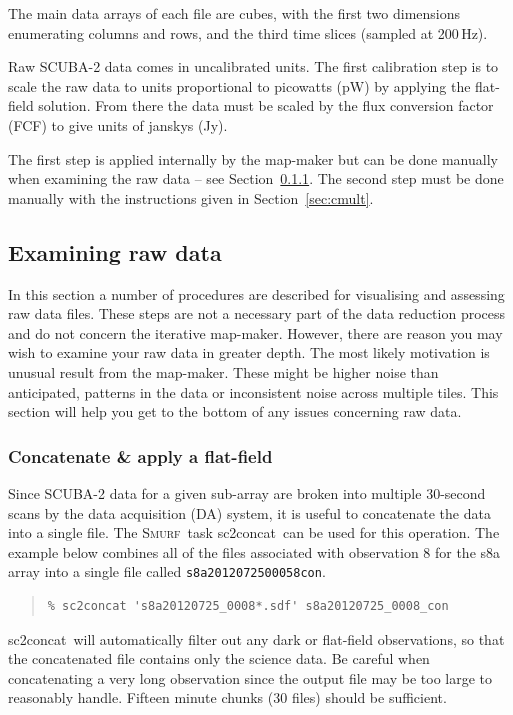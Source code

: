 \documentclass[twoside,11pt]{article}
\newcommand{\xref}[3]{#1}
\newcommand{\xlabel}[1]{}
\renewcommand{\_}{\texttt{\symbol{95}}}
\newenvironment{myquote}{\begin{quote}\begin{small}}{\end{small}\end{quote}}
\newcommand{\smurf}{\xref{\textsc{Smurf}}{sun258}{}}
\newcommand{\task}[1]{\textsf{#1}}
\newcommand{\concat}{\xref{\task{sc2concat}}{sun258}{SC2CONCAT}}
\begin{document}
The main data arrays of each file are cubes, with the first two
dimensions enumerating columns and rows, and the third time slices
(sampled at 200\,Hz).

Raw SCUBA-2 data comes in uncalibrated units. The first calibration
step is to scale the raw data to units proportional to picowatts (pW)
by applying the flat-field solution. From there the data must be
scaled by the flux conversion factor (FCF) to give units of janskys
(Jy).

The first step is applied internally by the map-maker but can be done
manually when examining the raw data -- see Section~\ref{sec:concat}.
The second step must be done manually with the instructions given in
Section~\ref{sec:cmult}.


\subsection{\xlabel{examine}Examining raw data}
\label{sec:exam}

In this section a number of procedures are described for visualising
and assessing raw data files.  These steps are not a necessary part of
the data reduction process and do not concern the iterative map-maker.
However, there are reason you may wish to examine your raw data in
greater depth. The most likely motivation is unusual result from the
map-maker. These might be higher noise than anticipated, patterns in
the data or inconsistent noise across multiple tiles. This section
will help you get to the bottom of any issues concerning raw data.

\subsubsection{\xlabel{concat}Concatenate \& apply a flat-field}
\label{sec:concat}

Since SCUBA-2 data for a given sub-array are broken into multiple
30-second scans by the data acquisition (DA) system, it is useful to
concatenate the data into a single file. The \smurf\ task \concat\ can
be used for this operation. The example below combines all of the
files associated with observation 8 for the s8a array into a single
file called \texttt{s8a20120725\_00058\_con}.

\begin{myquote}
\begin{verbatim}
% sc2concat 's8a20120725_0008*.sdf' s8a20120725_0008_con
\end{verbatim}
\end{myquote}
\concat\ will automatically filter out any dark or flat-field
observations, so that the concatenated file contains only the science
data. Be careful when concatenating a very long observation since the
output file may be too large to reasonably handle. Fifteen minute
chunks (30 files) should be sufficient.
\end{document}
